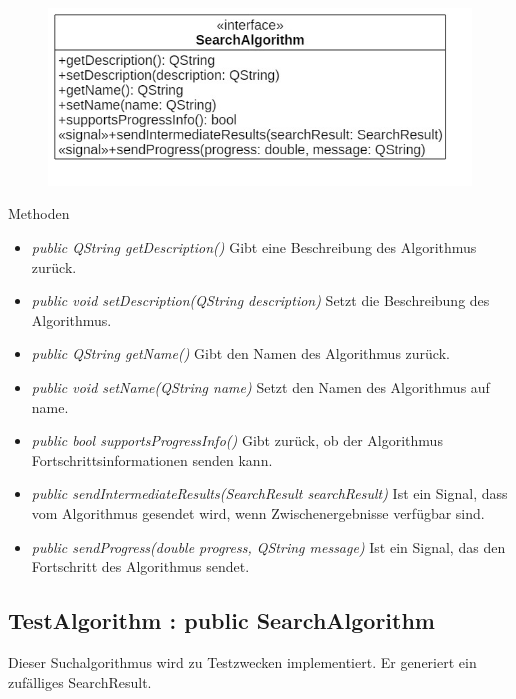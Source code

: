 \begin{figure}[H]
\centering
\includegraphics[scale=0.5]{img/Klassendiagramm/Klassen/Model/SearchAlgorithm}
\label{fig:searchAlgorithm}
\end{figure}

Methoden
\begin{itemize}
\item\textit{public QString getDescription()} Gibt eine Beschreibung des Algorithmus zurück.
\item\textit{public void setDescription(QString description)} Setzt die Beschreibung des Algorithmus.
\item\textit{public QString getName()} Gibt den Namen des Algorithmus zurück.
\item\textit{public void setName(QString name)} Setzt den Namen des Algorithmus auf name.
\item\textit{public bool supportsProgressInfo()} Gibt zurück, ob der Algorithmus Fortschrittsinformationen senden kann.
\item\textit{public sendIntermediateResults(SearchResult searchResult)} Ist ein Signal, dass vom Algorithmus gesendet wird, wenn Zwischenergebnisse verfügbar sind.
\item\textit{public sendProgress(double progress, QString message)} Ist ein Signal, das den Fortschritt des Algorithmus sendet.
\end{itemize}

\subsection*{TestAlgorithm : public SearchAlgorithm}
Dieser Suchalgorithmus wird zu Testzwecken implementiert. Er generiert ein zufälliges SearchResult.

